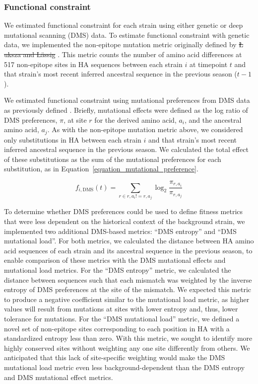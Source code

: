 \documentclass[9pt,lineno]{elife} %
\providecommand{\DIFdel}[1]{{\protect\color{red}\sout{#1}}}                      %
\providecommand{\DIFaddbegin}{} %
\providecommand{\DIFaddend}{} %
\providecommand{\DIFdelbegin}{} %
\providecommand{\DIFdelend}{} %
\providecommand{\DIFdeltex}[1]{{\protect\color{red}\sout{#1}}}                      %
\providecommand{\DIFaddbegin}{} %
\providecommand{\DIFaddend}{} %
\providecommand{\DIFdelbegin}{} %
\providecommand{\DIFdelend}{} %
\providecommand{\DIFdel}[1]{\texorpdfstring{\DIFdeltex{#1}}{}} %
\newcommand{\DIFscaledelfig}{0.5}
\newlength{\DIFdelgraphicswidth} %
\newlength{\DIFdelgraphicsheight} %
\newcommand{\DIFaddincludegraphics}[2][]{{\color{blue}\fbox{\DIFOincludegraphics[#1]{#2}}}} %
\newcommand{\DIFdelincludegraphics}[2][]{%
\sbox{\DIFdelgraphicsbox}{\DIFOincludegraphics[#1]{#2}}%
\settoboxwidth{\DIFdelgraphicswidth}{\DIFdelgraphicsbox} %
\settoboxtotalheight{\DIFdelgraphicsheight}{\DIFdelgraphicsbox} %
\scalebox{\DIFscaledelfig}{%
\parbox[b]{\DIFdelgraphicswidth}{\usebox{\DIFdelgraphicsbox}\\[-\baselineskip] \rule{\DIFdelgraphicswidth}{0em}}\llap{\resizebox{\DIFdelgraphicswidth}{\DIFdelgraphicsheight}{%
\setlength{\unitlength}{\DIFdelgraphicswidth}%
\begin{picture}(1,1)%
\thicklines\linethickness{2pt} %
{\color[rgb]{1,0,0}\put(0,0){\framebox(1,1){}}}%
{\color[rgb]{1,0,0}\put(0,0){\line( 1,1){1}}}%
{\color[rgb]{1,0,0}\put(0,1){\line(1,-1){1}}}%
\end{picture}%
}\hspace*{3pt}}} %
} %
\DeclareRobustCommand{\DIFaddbegin}{\DIFOaddbegin \let\includegraphics\DIFaddincludegraphics} %
\DeclareRobustCommand{\DIFaddend}{\DIFOaddend \let\includegraphics\DIFOincludegraphics} %
\DeclareRobustCommand{\DIFdelbegin}{\DIFOdelbegin \let\includegraphics\DIFdelincludegraphics} %
\DeclareRobustCommand{\DIFdelend}{\DIFOaddend \let\includegraphics\DIFOincludegraphics} %
\begin{document}
\subsubsection*{Functional constraint}

We estimated functional constraint for each strain using either genetic or deep mutational scanning (DMS) data.
To estimate functional constraint with genetic data, we implemented the non-epitope mutation metric originally defined by \DIFdelbegin %
\DIFdel{\L}%
\DIFdel{uksza and L\"assig }\DIFdelend \cite{Luksza:2014hj}.
This metric counts the number of amino acid differences at 517 non-epitope sites in HA sequences between each strain $i$ at timepoint $t$ and that strain's most recent inferred ancestral sequence in the previous season ($t - 1$).

We estimated functional constraint using mutational preferences from DMS data as previously defined \DIFdelbegin %
\DIFdelend \DIFaddbegin \citep{Lee2018}\DIFaddend .
Briefly, mutational effects were defined as the log ratio of DMS preferences, $\pi$, at site $r$ for the derived amino acid, $a_{i}$, and the ancestral amino acid, $a_{j}$.
As with the non-epitope mutation metric above, we considered only substitutions in HA between each strain $i$ and that strain's most recent inferred ancestral sequence in the previous season.
We calculated the total effect of these substitutions as the sum of the mutational preferences for each substitution, as in Equation~\ref{equation_mutational_preference}.

\begin{equation}
    f_{i,\mathrm{DMS}}(t) = \sum_{r \in r,a_{i} != r,a_{j}}\log_{2}\frac{\pi_{r,a_{i}}}{\pi_{r,a_{j}}}
    \label{equation_mutational_preference}
\end{equation}

To determine whether DMS preferences could be used to define fitness metrics that were less dependent on the historical context of the background strain, we implemented two additional DMS-based metrics: ``DMS entropy'' and ``DMS mutational load''.
For both metrics, we calculated the distance between HA amino acid sequences of each strain and its ancestral sequence in the previous season, to enable comparison of these metrics with the DMS mutational effects and mutational load metrics.
For the ``DMS entropy'' metric, we calculated the distance between sequences such that each mismatch was weighted by the inverse entropy of DMS preferences at the site of the mismatch.
We expected this metric to produce a negative coefficient similar to the mutational load metric, as higher values will result from mutations at sites with lower entropy and, thus, lower tolerance for mutations.
For the ``DMS mutational load'' metric, we defined a novel set of non-epitope sites corresponding to each position in HA with a standardized entropy less than zero.
With this metric, we sought to identify more highly conserved sites without weighting any one site differently from others.
We anticipated that this lack of site-specific weighting would make the DMS mutational load metric even less background-dependent than the DMS entropy and DMS mutational effect metrics.
\end{document}
